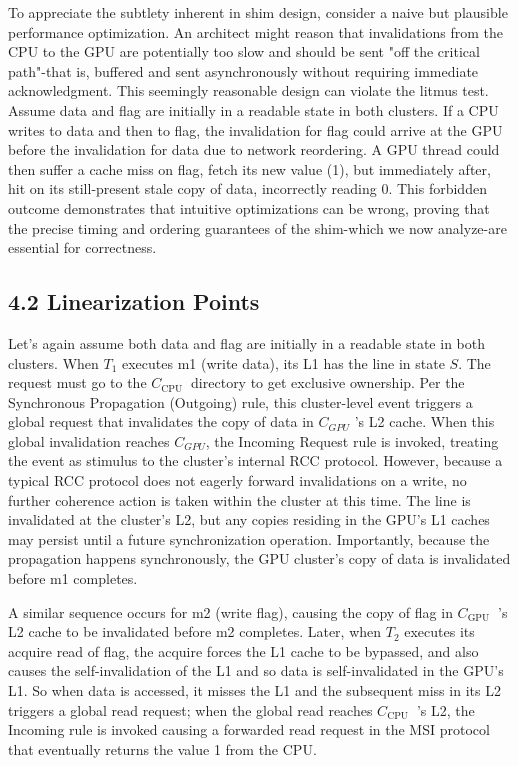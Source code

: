 \documentclass[10pt]{article}
\begin{document}
To appreciate the subtlety inherent in shim design, consider a naive but plausible performance optimization. An architect might reason that invalidations from the CPU to the GPU are potentially too slow and should be sent "off the critical path"-that is, buffered and sent asynchronously without requiring immediate acknowledgment. This seemingly reasonable design can violate the litmus test. Assume data and flag are initially in a readable state in both clusters. If a CPU writes to data and then to flag, the invalidation for flag could arrive at the GPU before the invalidation for data due to network reordering. A GPU thread could then suffer a cache miss on flag, fetch its new value (1), but immediately after, hit on its still-present stale copy of data, incorrectly reading 0. This forbidden outcome demonstrates that intuitive optimizations can be wrong, proving that the precise timing and ordering guarantees of the shim-which we now analyze-are essential for correctness.

\subsection*{4.2 Linearization Points}
Let's again assume both data and flag are initially in a readable state in both clusters. When $T_{1}$ executes m1 (write data), its L1 has the line in state $S$. The request must go to the $C_{\text {CPU }}$ directory to get exclusive ownership. Per the Synchronous Propagation (Outgoing) rule, this cluster-level event triggers a global request that invalidates the copy of data in $C_{G P U}$ 's L2 cache. When this global invalidation reaches $C_{G P U}$, the Incoming Request rule is invoked, treating the event as stimulus to the cluster's internal RCC protocol. However, because a typical RCC protocol does not eagerly forward invalidations on a write, no further coherence action is taken within the cluster at this time. The line is invalidated at the cluster's L2, but any copies residing in the GPU's L1 caches may persist until a future synchronization operation. Importantly, because the propagation happens synchronously, the GPU cluster's copy of data is invalidated before m1 completes.

A similar sequence occurs for m2 (write flag), causing the copy of flag in $C_{\text {GPU }}$ 's L2 cache to be invalidated before m2 completes. Later, when $T_{2}$ executes its acquire read of flag, the acquire forces the L1 cache to be bypassed, and also causes the self-invalidation of the L1 and so data is self-invalidated in the GPU's L1. So when data is accessed, it misses the L1 and the subsequent miss in its L2 triggers a global read request; when the global read reaches $C_{\text {CPU }}$ 's L2, the Incoming rule is invoked causing a forwarded read request in the MSI protocol that eventually returns the value 1 from the CPU.
\end{document}
